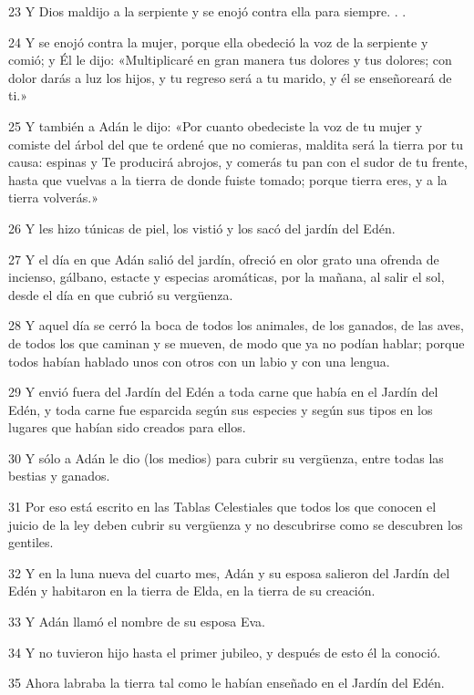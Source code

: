 \par 23 Y Dios maldijo a la serpiente y se enojó contra ella para siempre. . .
\par 24 Y se enojó contra la mujer, porque ella obedeció la voz de la serpiente y comió; y Él le dijo: «Multiplicaré en gran manera tus dolores y tus dolores; con dolor darás a luz los hijos, y tu regreso será a tu marido, y él se enseñoreará de ti.»
\par 25 Y también a Adán le dijo: «Por cuanto obedeciste la voz de tu mujer y comiste del árbol del que te ordené que no comieras, maldita será la tierra por tu causa: espinas y Te producirá abrojos, y comerás tu pan con el sudor de tu frente, hasta que vuelvas a la tierra de donde fuiste tomado; porque tierra eres, y a la tierra volverás.»
\par 26 Y les hizo túnicas de piel, los vistió y los sacó del jardín del Edén.
\par 27 Y el día en que Adán salió del jardín, ofreció en olor grato una ofrenda de incienso, gálbano, estacte y especias aromáticas, por la mañana, al salir el sol, desde el día en que cubrió su vergüenza.
\par 28 Y aquel día se cerró la boca de todos los animales, de los ganados, de las aves, de todos los que caminan y se mueven, de modo que ya no podían hablar; porque todos habían hablado unos con otros con un labio y con una lengua.
\par 29 Y envió fuera del Jardín del Edén a toda carne que había en el Jardín del Edén, y toda carne fue esparcida según sus especies y según sus tipos en los lugares que habían sido creados para ellos.
\par 30 Y sólo a Adán le dio (los medios) para cubrir su vergüenza, entre todas las bestias y ganados.
\par 31 Por eso está escrito en las Tablas Celestiales que todos los que conocen el juicio de la ley deben cubrir su vergüenza y no descubrirse como se descubren los gentiles.
\par 32 Y en la luna nueva del cuarto mes, Adán y su esposa salieron del Jardín del Edén y habitaron en la tierra de Elda, en la tierra de su creación.
\par 33 Y Adán llamó el nombre de su esposa Eva.
\par 34 Y no tuvieron hijo hasta el primer jubileo, y después de esto él la conoció.
\par 35 Ahora labraba la tierra tal como le habían enseñado en el Jardín del Edén.

